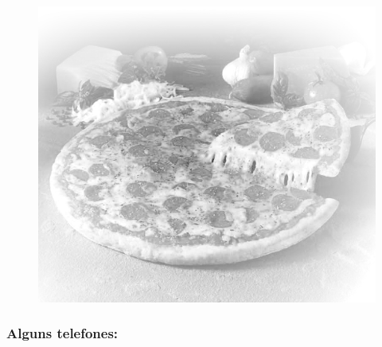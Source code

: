\begin{figure}[h!]
    \centering
    \includegraphics[width=.45\textwidth]{img/barao/pizza.jpg}
\end{figure}

\subsubsection*{Alguns telefones:}

